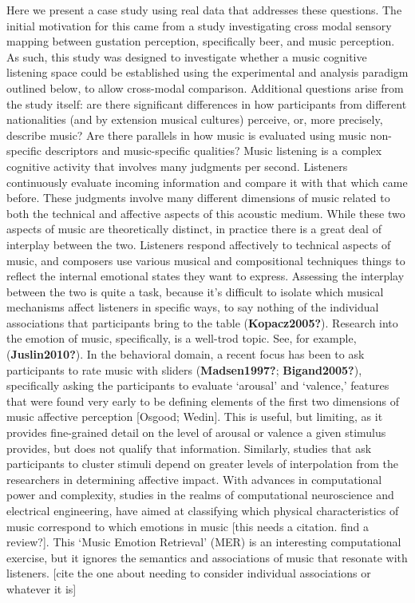 \documentclass[
  english,
  man,floatsintext]{apa6}
\begin{document}
Here we present a case study using real data that addresses these questions. The initial motivation for this came from a study investigating cross modal sensory mapping between gustation perception, specifically beer, and music perception. As such, this study was designed to investigate whether a music cognitive listening space could be established using the experimental and analysis paradigm outlined below, to allow cross-modal comparison. Additional questions arise from the study itself: are there significant differences in how participants from different nationalities (and by extension musical cultures) perceive, or, more precisely, describe music? Are there parallels in how music is evaluated using music non-specific descriptors and music-specific qualities?
Music listening is a complex cognitive activity that involves many judgments per second. Listeners continuously evaluate incoming information and compare it with that which came before. These judgments involve many different dimensions of music related to both the technical and affective aspects of this acoustic medium. While these two aspects of music are theoretically distinct, in practice there is a great deal of interplay between the two. Listeners respond affectively to technical aspects of music, and composers use various musical and compositional techniques things to reflect the internal emotional states they want to express. Assessing the interplay between the two is quite a task, because it's difficult to isolate which musical mechanisms affect listeners in specific ways, to say nothing of the individual associations that participants bring to the table (\textbf{Kopacz2005?}).
Research into the emotion of music, specifically, is a well-trod topic. See, for example, (\textbf{Juslin2010?}). In the behavioral domain, a recent focus has been to ask participants to rate music with sliders (\textbf{Madsen1997?}; \textbf{Bigand2005?}), specifically asking the participants to evaluate `arousal' and `valence,' features that were found very early to be defining elements of the first two dimensions of music affective perception {[}Osgood; Wedin{]}. This is useful, but limiting, as it provides fine-grained detail on the level of arousal or valence a given stimulus provides, but does not qualify that information. Similarly, studies that ask participants to cluster stimuli depend on greater levels of interpolation from the researchers in determining affective impact. With advances in computational power and complexity, studies in the realms of computational neuroscience and electrical engineering, have aimed at classifying which physical characteristics of music correspond to which emotions in music {[}this needs a citation. find a review?{]}. This `Music Emotion Retrieval' (MER) is an interesting computational exercise, but it ignores the semantics and associations of music that resonate with listeners. {[}cite the one about needing to consider individual associations or whatever it is{]}\\
\end{document}
